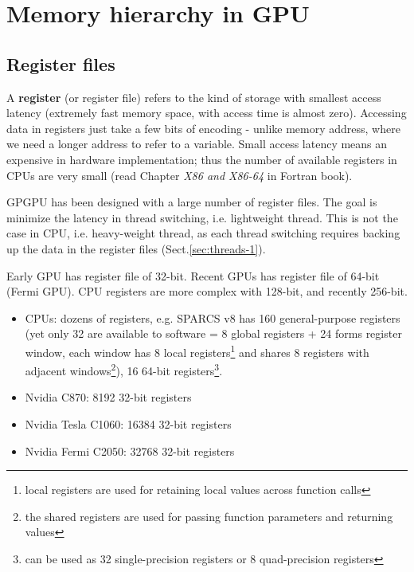 \section{Memory hierarchy in GPU}

\subsection{Register files}
\label{sec:register-files}

A {\bf register} (or register file) refers to the kind of storage with smallest
access latency (extremely fast memory space, with access time is almost zero).
Accessing data in registers just take a few bits of encoding - unlike memory
address, where we need a longer address to refer to a variable.
Small access latency means an expensive in hardware implementation; thus the
number of available registers in CPUs are very small (read Chapter {\it X86 and
X86-64} in Fortran book).


GPGPU has been designed with a large number of register files. The goal is
minimize the latency in thread switching, i.e. lightweight thread. This is not
the case in CPU, i.e. heavy-weight thread, as each thread switching requires
backing up the data in the register files (Sect.\ref{sec:threads-1}).

Early GPU has register file of 32-bit. Recent GPUs has register file of
64-bit (Fermi GPU).  CPU registers are more complex with 128-bit, and
recently 256-bit.
% 
  \begin{itemize}
  \item CPUs: dozens of registers, e.g. SPARCS v8 has 160
    general-purpose registers (yet only 32 are available to software =
    8 global registers + 24 forms register window, each window has 8
    local
    registers\footnote{local registers are used for retaining local
      values across function calls}
    and shares 8 registers with adjacent
    windows\footnote{the shared registers are used for passing
      function parameters and returning values}),
    16 64-bit
    registers\footnote{can be used as 32 single-precision registers or
      8 quad-precision registers}.
      
  \item Nvidia C870: 8192 32-bit registers
\item Nvidia Tesla C1060: 16384 32-bit registers
\item Nvidia Fermi C2050: 32768 32-bit registers
  \end{itemize}

